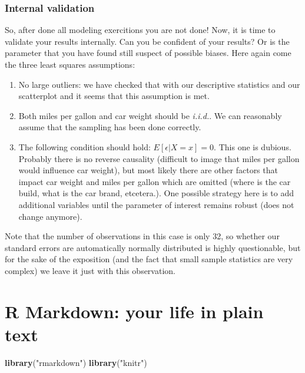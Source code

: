 \documentclass[]{article}
\newenvironment{Shaded}{\begin{snugshade}}{\end{snugshade}}
\newcommand{\KeywordTok}[1]{\textcolor[rgb]{0.13,0.29,0.53}{\textbf{#1}}}
\newcommand{\StringTok}[1]{\textcolor[rgb]{0.31,0.60,0.02}{#1}}
\newcommand{\NormalTok}[1]{#1}
\theoremstyle{definition}
\theoremstyle{definition}
\theoremstyle{definition}
\theoremstyle{remark}
\begin{document}
\subsubsection{Internal validation}\label{internal-validation}

So, after done all modeling exercitions you are not done! Now, it is
time to validate your results internally. Can you be confident of your
results? Or is the parameter that you have found still suspect of
possible biases. Here again come the three least squares assumptions:

\begin{enumerate}
\def\labelenumi{\arabic{enumi}.}
\item
  No large outliers: we have checked that with our descriptive
  statistics and our scatterplot and it seems that this assumption is
  met.
\item
  Both miles per gallon and car weight should be \emph{i.i.d.}. We can
  reasonably assume that the sampling has been done correctly.
\item
  The following condition should hold: \(E[\epsilon|X=x] = 0\). This one
  is dubious. Probably there is no reverse causality (difficult to image
  that miles per gallon would influence car weight), but most likely
  there are other factors that impact car weight and miles per gallon
  which are omitted (where is the car build, what is the car brand,
  etcetera.). One possible strategy here is to add additional variables
  until the parameter of interest remains robust (does not change
  anymore).
\end{enumerate}

Note that the number of observations in this case is only 32, so whether
our standard errors are automatically normally distributed is highly
questionable, but for the sake of the exposition (and the fact that
small sample statistics are very complex) we leave it just with this
observation.

\section{R Markdown: your life in plain
text}\label{r-markdown-your-life-in-plain-text}

\begin{Shaded}
\begin{Highlighting}[]
\KeywordTok{library}\NormalTok{(}\StringTok{"rmarkdown"}\NormalTok{)}
\KeywordTok{library}\NormalTok{(}\StringTok{"knitr"}\NormalTok{)}
\end{Highlighting}
\end{Shaded}
\end{document}
